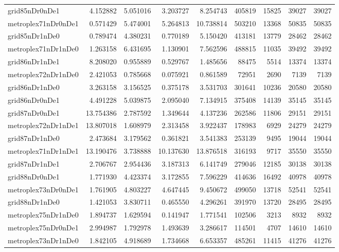 \begin{longtable}{|l|r|r|r|r|r|r|r|r|}
grid85nDr0nDe1 & 4.152882 & 5.051016 & 3.203727 & 8.254743 & 405819 & 15825 & 39027 & 39027 \\
metroplex71nDr0nDe1 & 0.571429 & 5.474001 & 5.264813 & 10.738814 & 503210 & 13368 & 50835 & 50835 \\
grid85nDr1nDe0 & 0.789474 & 4.380231 & 0.770189 & 5.150420 & 413181 & 13779 & 28462 & 28462 \\
metroplex71nDr1nDe0 & 1.263158 & 6.431695 & 1.130901 & 7.562596 & 488815 & 11035 & 39492 & 39492 \\
grid86nDr1nDe1 & 8.208020 & 0.955889 & 0.529767 & 1.485656 & 88475 & 5514 & 13374 & 13374 \\
metroplex72nDr1nDe0 & 2.421053 & 0.785668 & 0.075921 & 0.861589 & 72951 & 2690 & 7139 & 7139 \\
grid86nDr1nDe0 & 3.263158 & 3.156525 & 0.375178 & 3.531703 & 301641 & 10236 & 20580 & 20580 \\
grid86nDr0nDe1 & 4.491228 & 5.039875 & 2.095040 & 7.134915 & 375408 & 14139 & 35145 & 35145 \\
grid87nDr0nDe1 & 13.754386 & 2.787592 & 1.349644 & 4.137236 & 262586 & 11806 & 29151 & 29151 \\
metroplex72nDr1nDe1 & 13.807018 & 1.608979 & 2.313458 & 3.922437 & 178983 & 6929 & 24279 & 24279 \\
grid87nDr1nDe0 & 2.473684 & 3.179562 & 0.361821 & 3.541383 & 253139 & 9495 & 19044 & 19044 \\
metroplex71nDr1nDe1 & 13.190476 & 3.738888 & 10.137630 & 13.876518 & 316193 & 9717 & 35550 & 35550 \\
grid87nDr1nDe1 & 2.706767 & 2.954436 & 3.187313 & 6.141749 & 279046 & 12185 & 30138 & 30138 \\
grid88nDr0nDe1 & 1.771930 & 4.423374 & 3.172855 & 7.596229 & 414636 & 16492 & 40978 & 40978 \\
metroplex73nDr0nDe1 & 1.761905 & 4.803227 & 4.647445 & 9.450672 & 499050 & 13718 & 52541 & 52541 \\
grid88nDr1nDe0 & 1.421053 & 3.830711 & 0.465550 & 4.296261 & 391970 & 13720 & 28495 & 28495 \\
metroplex75nDr1nDe0 & 1.894737 & 1.629594 & 0.141947 & 1.771541 & 102506 & 3213 & 8932 & 8932 \\
metroplex75nDr0nDe1 & 2.994987 & 1.792978 & 1.493639 & 3.286617 & 114501 & 4707 & 14610 & 14610 \\
metroplex73nDr1nDe0 & 1.842105 & 4.918689 & 1.734668 & 6.653357 & 485261 & 11415 & 41276 & 41276 \\

\end{longtable}
